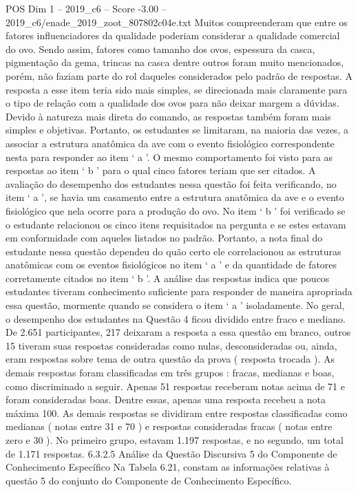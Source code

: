\begin{textsample}{POS Dim 1 – 2019\_c6 – Score -3.00 – 2019\_c6/enade\_2019\_zoot\_807802c04e.txt}
Muitos compreenderam que entre os fatores influenciadores da qualidade poderiam considerar a qualidade comercial do ovo.
Sendo assim, fatores como tamanho dos ovos, espessura da casca, pigmentação da gema, trincas na casca dentre outros foram muito mencionados, porém, não faziam parte do rol daqueles considerados pelo padrão de respostas.
A resposta a esse item teria sido mais simples, se direcionada mais claramente para o tipo de relação com a qualidade dos ovos para não deixar margem a dúvidas.
Devido à natureza mais direta do comando, as respostas também foram mais simples e objetivas.
Portanto, os estudantes se limitaram, na maioria das vezes, a associar a estrutura anatômica da ave com o evento fisiológico correspondente nesta para responder ao item ‘ a ’.
O mesmo comportamento foi visto para as respostas ao item ‘ b ’ para o qual cinco fatores teriam que ser citados.
A avaliação do desempenho dos estudantes nessa questão foi feita verificando, no item ‘ a ’, se havia um casamento entre a estrutura anatômica da ave e o evento fisiológico que nela ocorre para a produção do ovo.
No item ‘ b ’ foi verificado se o estudante relacionou os cinco itens requisitados na pergunta e se estes estavam em conformidade com aqueles listados no padrão.
Portanto, a nota final do estudante nessa questão dependeu do quão certo ele correlacionou as estruturas anatômicas com os eventos fisiológicos no item ‘ a ’ e da quantidade de fatores corretamente citados no item ‘ b ’.
A análise das respostas indica que poucos estudantes tiveram conhecimento suficiente para responder de maneira apropriada essa questão, mormente quando se considera o item ‘ a ’ isoladamente.
No geral, o desempenho dos estudantes na Questão 4 ficou dividido entre fraco e mediano.
De 2.651 participantes, 217 deixaram a resposta a essa questão em branco, outros 15 tiveram suas respostas consideradas como nulas, desconsideradas ou, ainda, eram respostas sobre tema de outra questão da prova ( resposta trocada ).
As demais respostas foram classificadas em três grupos : fracas, medianas e boas, como discriminado a seguir.
Apenas 51 respostas receberam notas acima de 71 e foram consideradas boas.
Dentre essas, apenas uma resposta recebeu a nota máxima 100.
As demais respostas se dividiram entre respostas classificadas como medianas ( notas entre 31 e 70 ) e respostas consideradas fracas ( notas entre zero e 30 ).
No primeiro grupo, estavam 1.197 respostas, e no segundo, um total de 1.171 respostas. 6.3.2.5 Análise da Questão Discursiva 5 do Componente de Conhecimento Específico Na Tabela 6.21, constam as informações relativas à questão 5 do conjunto do Componente de Conhecimento Específico.

\end{textsample}
